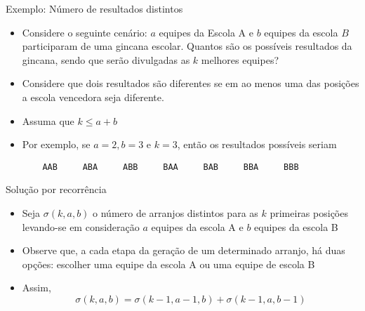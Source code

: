 \begin{frame}[fragile]{Exemplo: Número de resultados distintos}

    \begin{itemize}
        \item Considere o seguinte cenário: $a$ equipes da Escola A e $b$ equipes da escola $B$
            participaram de uma gincana escolar. Quantos são os possíveis resultados da gincana,
            sendo que serão divulgadas as $k$ melhores equipes?

        \item Considere que dois resultados
            são diferentes se em ao menos uma das posições a escola vencedora seja diferente.

        \item Assuma que $k \leq a + b$

        \item Por exemplo, se $a = 2, b = 3$ e $k = 3$, então os resultados possíveis seriam
\begin{verbatim}
    AAB     ABA     ABB     BAA     BAB     BBA     BBB
\end{verbatim}

    \end{itemize}

\end{frame}

\begin{frame}[fragile]{Solução por recorrência}

    \begin{itemize}
        \item Seja $\sigma(k, a, b)$ o número de arranjos distintos para as $k$ primeiras posições
            levando-se em consideração $a$ equipes da escola A e $b$ equipes da escola B

        \item Observe que, a cada etapa da geração de um determinado arranjo, há duas opções:
            escolher uma equipe da escola A ou uma equipe de escola B

        \item  Assim,
$$
    \sigma(k, a, b) = \sigma(k - 1, a - 1, b) + \sigma(k - 1, a, b - 1)
$$
    \end{itemize}

\end{frame}

